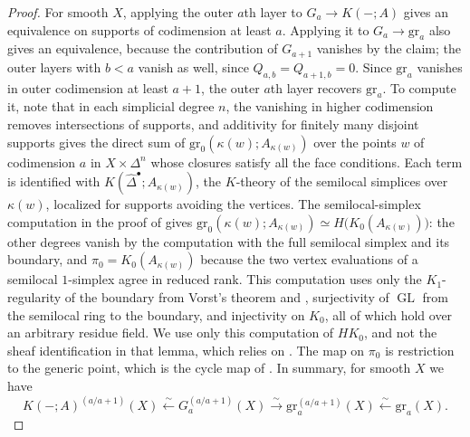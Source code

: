 \begin{proof}
For smooth $X$, applying the outer $a$th layer to $G_a\to K(-;A)$ gives an equivalence on supports of codimension at least $a$.
Applying it to $G_a\to\mathrm{gr}_a$ also gives an equivalence, because the contribution of $G_{a+1}$ vanishes by the claim; the outer layers with $b<a$ vanish as well, since $Q_{a,b}=Q_{a+1,b}=0$.
Since $\mathrm{gr}_a$ vanishes in outer codimension at least $a+1$, the outer $a$th layer recovers $\mathrm{gr}_a$.
To compute it, note that in each simplicial degree $n$, the vanishing in higher codimension removes intersections of supports, and additivity for finitely many disjoint supports gives the direct sum of $\mathrm{gr}_0(\kappa(w);A_{\kappa(w)})$ over the points $w$ of codimension $a$ in $X\times\Delta^n$ whose closures satisfy all the face conditions.
Each term is identified with $K(\widehat\Delta^\bullet;A_{\kappa(w)})$, the $K$-theory of the semilocal simplices over $\kappa(w)$, localized for supports avoiding the vertices.
The semilocal-simplex computation in the proof of \cite[Lemma 6.4.3]{KahnLevine2010} gives $\mathrm{gr}_0(\kappa(w);A_{\kappa(w)})\simeq H\bigl(K_0(A_{\kappa(w)})\bigr)$: the other degrees vanish by the computation with the full semilocal simplex and its boundary, and $\pi_0=K_0(A_{\kappa(w)})$ because the two vertex evaluations of a semilocal $1$-simplex agree in reduced rank.
This computation uses only the $K_1$-regularity of the boundary from Vorst's theorem and \cite[Proposition B.5]{KahnLevine2010}, surjectivity of $\operatorname{GL}$ from the semilocal ring to the boundary, and injectivity on $K_0$, all of which hold over an arbitrary residue field.
We use only this computation of $HK_0$, and not the sheaf identification in that lemma, which relies on \cite[Theorem 3.2.4]{KahnLevine2010}.
The map on $\pi_0$ is restriction to the generic point, which is the cycle map of \cite[\S6.2]{KahnLevine2010}.
In summary, for smooth $X$ we have
\[
 K(-;A)^{(a/a+1)}(X)\xleftarrow{\ \sim\ }G_a^{(a/a+1)}(X)\xrightarrow{\ \sim\ }\mathrm{gr}_a^{(a/a+1)}(X)\xleftarrow{\ \sim\ }\mathrm{gr}_a(X).
\]
\end{proof}

